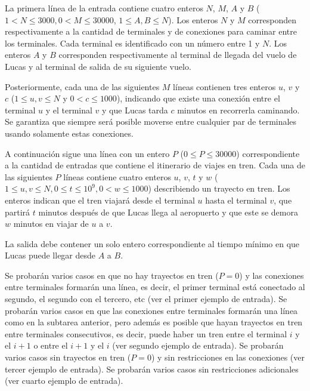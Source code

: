 \documentclass{oci}
\begin{document}
\begin{inputDescription}
  La primera línea de la entrada contiene cuatro enteros $N$, $M$, $A$ y $B$
  ($1 < N\leq 3000, 0 < M \leq 30000$, $1 \leq A, B\leq N$).
  Los enteros $N$ y $M$ corresponden respectivamente a la cantidad de terminales
  y de conexiones para caminar entre los terminales.
  Cada terminal es identificado con un número entre 1 y $N$.
  Los enteros $A$ y $B$ corresponden respectivamente al terminal de llegada del vuelo de Lucas 
  y al terminal de salida de su siguiente vuelo.

  Posteriormente, cada una de las siguientes $M$ líneas contienen tres enteros
  $u$, $v$ y $c$ ($1\leq u, v\leq N$ y $0<c\leq 1000$), indicando que existe una
  conexión entre el terminal $u$ y el terminal $v$ y que Lucas tarda $c$ minutos
  en recorrerla caminando.
  Se garantiza que siempre será posible moverse entre cualquier par de
  terminales usando solamente estas conexiones.

  A continuación sigue una línea con un entero $P$ ($0\leq P \leq 30000$)
  correspondiente a la cantidad de entradas que contiene el itinerario de viajes
  en tren.
  Cada una de las siguientes $P$ líneas contiene cuatro enteros $u$, $v$,
  $t$ y $w$ ($1 \leq u,v \leq N, 0\leq t\leq 10^9, 0 < w \leq 1000$)
  describiendo un trayecto en tren. 
  Los enteros indican que el tren viajará desde el terminal $u$ hasta el
  terminal $v$, que partirá $t$ minutos después de que Lucas llega al aeropuerto
  y que este se demora $w$ minutos en viajar de $u$ a $v$.
\end{inputDescription}

\begin{outputDescription}
  La salida debe contener un solo entero correspondiente al tiempo mínimo en que
  Lucas puede llegar desde $A$ a $B$.
\end{outputDescription}

\begin{scoreDescription}
   Se probarán varios casos en que no hay trayectos en tren ($P=0$) y
  las conexiones entre terminales formarán una línea, es decir, el primer
  terminal está conectado al segundo, el segundo con el tercero, etc (ver
  el primer ejemplo de entrada). 
   Se probarán varios casos en que las conexiones entre terminales formarán una línea 
  como en la subtarea anterior, pero además es posible que hayan
  trayectos en tren entre terminales consecutivos, es decir, puede haber un
  tren entre el terminal $i$ y el $i+1$ o entre el $i+1$ y el $i$ (ver segundo
  ejemplo de entrada).
   Se probarán varios casos sin trayectos en tren ($P=0$) y sin
  restricciones en las conexiones (ver tercer ejemplo de entrada).
   Se probarán varios casos sin restricciones adicionales (ver cuarto
  ejemplo de entrada).
\end{scoreDescription}

\begin{sampleDescription}
\end{sampleDescription}
\end{document}

